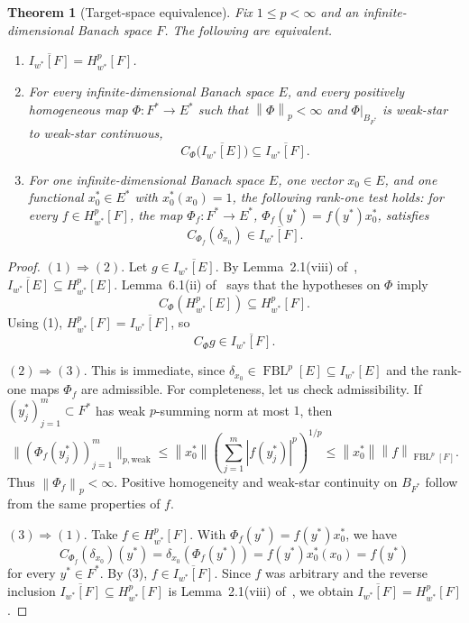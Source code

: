 \documentclass[11pt]{article}
\newtheorem{theorem}{Theorem}
\newcommand{\FBL}{\operatorname{FBL}}
\newcommand{\Iw}{I_{w^*}}
\newcommand{\Hw}{H_{w^*}^p}
\newcommand{\norm}[1]{\left\lVert #1 \right\rVert}
\begin{document}
\begin{theorem}[Target-space equivalence]
\label{thm:equivalence}
Fix \(1\leq p<\infty\) and an infinite-dimensional Banach space \(F\).  The following are
equivalent.
\begin{enumerate}
\item \(\overline{\Iw[F]}=\Hw[F]\).
\item For every infinite-dimensional Banach space \(E\), and every positively homogeneous map
\(\Phi:F^*\to E^*\) such that \(\norm{\Phi}_p<\infty\) and
\(\Phi|_{B_{F^*}}\) is weak-star to weak-star continuous,
\[
  C_\Phi\bigl(\overline{\Iw[E]}\bigr)\subseteq \overline{\Iw[F]}.
\]
\item For one infinite-dimensional Banach space \(E\), one vector \(x_0\in E\), and one functional
\(x_0^*\in E^*\) with \(x_0^*(x_0)=1\), the following rank-one test holds: for every
\(f\in \Hw[F]\), the map \(\Phi_f:F^*\to E^*\), \(\Phi_f(y^*)=f(y^*)x_0^*\), satisfies
\[
  C_{\Phi_f}(\delta_{x_0})\in \overline{\Iw[F]}.
\]
\end{enumerate}
\end{theorem}

\begin{proof}
\((1)\Rightarrow(2)\).  Let \(g\in\overline{\Iw[E]}\).  By Lemma~2.1(viii) of~\cite{LT},
\(\overline{\Iw[E]}\subseteq H_{w^*}^p[E]\).  Lemma~6.1(ii) of~\cite{LT} says that the hypotheses
on \(\Phi\) imply
\[
  C_\Phi(H_{w^*}^p[E])\subseteq H_{w^*}^p[F].
\]
Using (1), \(H_{w^*}^p[F]=\overline{\Iw[F]}\), so
\[
  C_\Phi g\in \overline{\Iw[F]}.
\]

\((2)\Rightarrow(3)\).  This is immediate, since \(\delta_{x_0}\in\FBL^p[E]\subseteq\Iw[E]\) and
the rank-one maps \(\Phi_f\) are admissible.  For completeness, let us check admissibility.  If
\((y_j^*)_{j=1}^m\subset F^*\) has weak \(p\)-summing norm at most \(1\), then
\[
 \bigl\|(\Phi_f(y_j^*))_{j=1}^m\bigr\|_{p,\mathrm{weak}}
 \leq \norm{x_0^*}\left(\sum_{j=1}^m |f(y_j^*)|^p\right)^{1/p}
 \leq \norm{x_0^*}\norm{f}_{\FBL^p[F]}.
\]
Thus \(\norm{\Phi_f}_p<\infty\).  Positive homogeneity and weak-star continuity on \(B_{F^*}\)
follow from the same properties of \(f\).

\((3)\Rightarrow(1)\).  Take \(f\in H_{w^*}^p[F]\).  With \(\Phi_f(y^*)=f(y^*)x_0^*\), we have
\[
  C_{\Phi_f}(\delta_{x_0})(y^*)
  =\delta_{x_0}(\Phi_f(y^*))
  =f(y^*)x_0^*(x_0)
  =f(y^*)
\]
for every \(y^*\in F^*\).  By (3), \(f\in\overline{\Iw[F]}\).  Since \(f\) was arbitrary and the
reverse inclusion \(\overline{\Iw[F]}\subseteq H_{w^*}^p[F]\) is Lemma~2.1(viii) of~\cite{LT}, we
obtain \(\overline{\Iw[F]}=H_{w^*}^p[F]\).
\end{proof}
\end{document}
